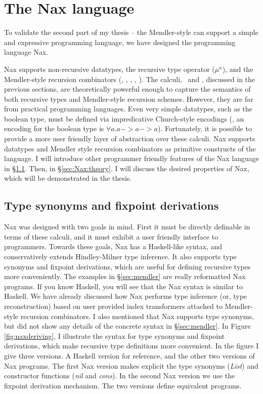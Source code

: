 \section{The Nax language}\label{sec:Nax}

To validate the second part of my thesis -- the Mendler-style can support 
a simple and expressive programming language, we have designed the
programming language Nax.

Nax supports non-recursive datatypes, the recursive type operator
($\mu^\kappa$), and the Mendler-style recursion combinators (\MIt, \MPr,
\McvIt, \McvPr, \MsfIt). The calculi, \Fi\ and \Fixi, discussed
in the previous sections, are theoretically powerful enough to capture
the semantics of both recursive types and Mendler-style recursion schemes.
However, they are far from practical programming languages. Even very simple
datatypes, such as the boolean type, must be defined via impredicative 
Church-style encodings (\eg, an encoding for the boolean type is
$\forall a . a -> a -> a$). Fortunately, it is possible to provide
a more user friendly layer of abstraction over these calculi. Nax supports
datatypes and Mendler style recursion combinators as primitive constructs of
the language. I will introduce other programmer friendly features of
the Nax language in \S\ref{sec:Nax:tysym}. Then, in \S\ref{sec:Nax:theory},
I will discuss the desired properties of Nax, which will be demonstrated
in the thesis.

\subsection{Type synonyms and fixpoint derivations}\label{sec:Nax:tysym}

Nax was designed with two goals in mind. First it must be directly definable
in terms of these calculi, and it must exhibit a user friendly interface to
programmers. Towards these goals, Nax has a Haskell-like syntax, and
conservatively extends Hindley-Milner type inference. It also supports
type synonyms and fixpoint derivations, which are useful for defining
recursive types more conveniently. The examples in \S\ref{sec:mendler} are
really reformatted Nax programs. If you know Haskell, you will see that
the Nax syntax is similar to Haskell. We have already discussed how Nax
performs type inference (or, type reconstruction) based on user provided
index transformers attached to Mendler-style recursion combinators. I also
mentioned that Nax supports type synonyms, but did not show any details of
the concrete syntax in \S\ref{sec:mendler}. In Figure \ref{fig:naxderiving},
I illustrate the syntax for type synonyms and fixpoint derivations, which make
recursive type definitions more convenient. In the figure I give three versions.
A Haskell version for reference, and the other two versions of Nax programs.
The first Nax version makes explicit the type synonyms (\textit{List})
and constructor functions (\textit{nil} and \textit{cons}).
In the second Nax version we use the fixpoint derivation mechanism.
The two versions define equivalent programs.

